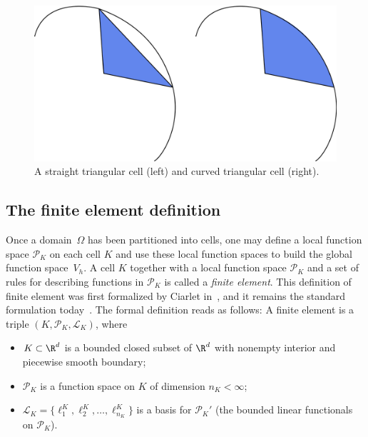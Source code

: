 \begin{figure}
  \begin{center}
    \includegraphics[width=\largefig]{chapters/kirby-7/pdf/straight_and_curved_triangles.pdf}
    \caption{A straight triangular cell (left) and curved triangular
      cell (right).}
    \label{fig:shapes,curved}
  \end{center}
\end{figure}

\subsection{The finite element definition}

Once a domain~$\Omega$ has been partitioned into cells, one may define
a local function space $\mathcal{P}_K$ on each cell $K$ and use these
local function spaces to build the global function space~$V_h$. A cell
$K$ together with a local function space $\mathcal{P}_K$ and a set of
rules for describing functions in $\mathcal{P}_K$ is called a
\emph{finite element}. This definition of finite element was first
formalized by Ciarlet in~\citet{Ciarlet1978,Ciarlet2002}, and it
remains the standard formulation
today~\cite{BrennerScott1994,BrennerScott2008}. The formal definition
reads as follows: A finite element is a triple $(K, \mathcal{P}_K,
\mathcal{L}_K)$, where
\begin{itemize}
\item
  $K \subset \R^d$ is a bounded closed subset of $\R^d$ with nonempty
  interior and piecewise smooth boundary;
\item
  $\mathcal{P}_K$ is a function space on $K$ of dimension $n_K < \infty$;
\item
  $\mathcal{L}_K = \{\ell^K_1, \ell^K_2, \ldots, \ell^K_{n_K}\}$ is a
  basis for $\mathcal{P}_K'$ (the bounded linear functionals on
  $\mathcal{P}_K$).
\end{itemize}

